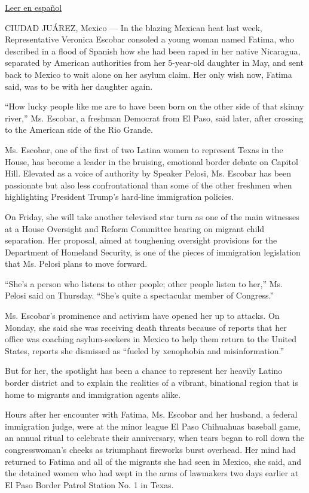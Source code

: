 \href{https://www.nytimes3xbfgragh.onion/es/2019/07/12/veronica-escobar-migrantes-eeuu}{Leer
en español}

CIUDAD JUÁREZ, Mexico --- In the blazing Mexican heat last week,
Representative Veronica Escobar consoled a young woman named Fatima, who
described in a flood of Spanish how she had been raped in her native
Nicaragua, separated by American authorities from her 5-year-old
daughter in May, and sent back to Mexico to wait alone on her asylum
claim. Her only wish now, Fatima said, was to be with her daughter
again.

``How lucky people like me are to have been born on the other side of
that skinny river,'' Ms. Escobar, a freshman Democrat from El Paso, said
later, after crossing to the American side of the Rio Grande.

Ms. Escobar, one of the first of two Latina women to represent Texas in
the House, has become a leader in the bruising, emotional border debate
on Capitol Hill. Elevated as a voice of authority by Speaker Pelosi, Ms.
Escobar has been passionate but also less confrontational than some of
the other freshmen when highlighting President Trump's hard-line
immigration policies.

On Friday, she will take another televised star turn as one of the main
witnesses at a House Oversight and Reform Committee hearing on migrant
child separation. Her proposal, aimed at toughening oversight provisions
for the Department of Homeland Security, is one of the pieces of
immigration legislation that Ms. Pelosi plans to move forward.

``She's a person who listens to other people; other people listen to
her,'' Ms. Pelosi said on Thursday. ``She's quite a spectacular member
of Congress.''

Ms. Escobar's prominence and activism have opened her up to attacks. On
Monday, she said she was receiving death threats because of reports that
her office was coaching asylum-seekers in Mexico to help them return to
the United States, reports she dismissed as ``fueled by xenophobia and
misinformation.''

But for her, the spotlight has been a chance to represent her heavily
Latino border district and to explain the realities of a vibrant,
binational region that is home to migrants and immigration agents alike.

Hours after her encounter with Fatima, Ms. Escobar and her husband, a
federal immigration judge, were at the minor league El Paso Chihuahuas
baseball game, an annual ritual to celebrate their anniversary, when
tears began to roll down the congresswoman's cheeks as triumphant
fireworks burst overhead. Her mind had returned to Fatima and all of the
migrants she had seen in Mexico, she said, and the detained women who
had wept in the arms of lawmakers two days earlier at El Paso Border
Patrol Station No. 1 in Texas.

